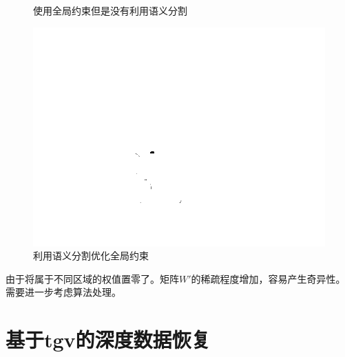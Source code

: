 \documentclass[UTF8]{ctexart}
\begin{document}
\begin{sloppypar}
\begin{figure}[htbp]
\begin{minipage}[t]{0.5\linewidth}
            \caption{\small 使用全局约束但是没有利用语义分割}
            \label{fig:colorize:noseg}
        \end{minipage}
        \begin{minipage}[t]{0.5\linewidth}
            \centering
            \includegraphics[scale=0.25]{figure/result_colorized_allregion_seg.png}
            \caption{\small 利用语义分割优化全局约束}
            \label{fig:colorize:seg}
        \end{minipage}
    \end{figure}\par
    由于将属于不同区域的权值置零了。矩阵$W'$的稀疏程度增加，容易产生奇异性。需要进一步考虑算法处理。\par


\section{基于tgv的深度数据恢复}

\end{sloppypar}
\end{document}
